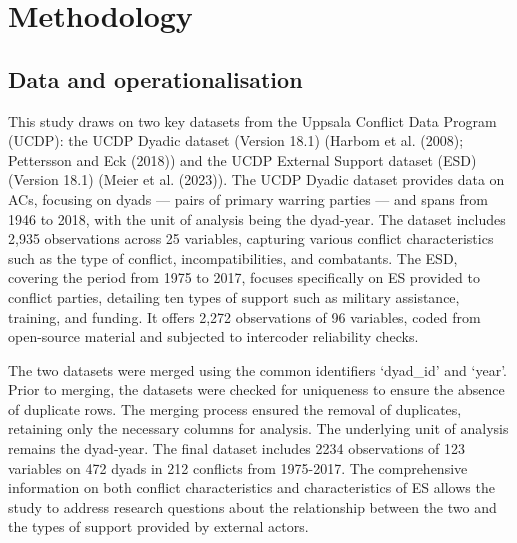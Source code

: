 \documentclass[
]{article}
\begin{document}
\section{Methodology}\label{methodology}

\subsection{Data and
operationalisation}\label{data-and-operationalisation}

This study draws on two key datasets from the Uppsala Conflict Data
Program (UCDP): the UCDP Dyadic dataset (Version 18.1) (Harbom et al.
(2008); Pettersson and Eck (2018)) and the UCDP External Support dataset
(ESD) (Version 18.1) (Meier et al. (2023)). The UCDP Dyadic dataset
provides data on ACs, focusing on dyads --- pairs of primary warring
parties --- and spans from 1946 to 2018, with the unit of analysis being
the dyad-year. The dataset includes 2,935 observations across 25
variables, capturing various conflict characteristics such as the type
of conflict, incompatibilities, and combatants. The ESD, covering the
period from 1975 to 2017, focuses specifically on ES provided to
conflict parties, detailing ten types of support such as military
assistance, training, and funding. It offers 2,272 observations of 96
variables, coded from open-source material and subjected to intercoder
reliability checks.

The two datasets were merged using the common identifiers `dyad\_id' and
`year'. Prior to merging, the datasets were checked for uniqueness to
ensure the absence of duplicate rows. The merging process ensured the
removal of duplicates, retaining only the necessary columns for
analysis. The underlying unit of analysis remains the dyad-year. The
final dataset includes 2234 observations of 123 variables on 472 dyads
in 212 conflicts from 1975-2017. The comprehensive information on both
conflict characteristics and characteristics of ES allows the study to
address research questions about the relationship between the two and
the types of support provided by external actors.
\end{document}
